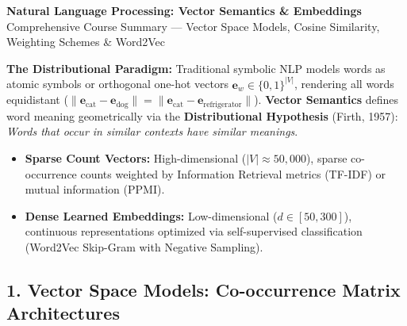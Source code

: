 \documentclass[10pt,a4paper]{article}
\begin{document}
\begin{center}
    \vspace{-4pt}
    {\LARGE\bfseries\color{themeblue} Natural Language Processing: Vector Semantics \& Embeddings}\\[1pt]
    {\small\color{darkgray} Comprehensive Course Summary --- Vector Space Models, Cosine Similarity, Weighting Schemes \& Word2Vec}
    \vspace{-4pt}
\end{center}

\begin{overviewbox}
\footnotesize
\textbf{The Distributional Paradigm:} Traditional symbolic NLP models words as atomic symbols or orthogonal one-hot vectors $\mathbf{e}_w \in \{0, 1\}^{|V|}$, rendering all words equidistant ($\|\mathbf{e}_{\text{cat}} - \mathbf{e}_{\text{dog}}\| = \|\mathbf{e}_{\text{cat}} - \mathbf{e}_{\text{refrigerator}}\|$). \textbf{Vector Semantics} defines word meaning geometrically via the \textbf{Distributional Hypothesis} (Firth, 1957): \textit{Words that occur in similar contexts have similar meanings}.
\begin{itemize}[leftmargin=10pt,topsep=1pt,itemsep=0.5pt]
    \item \textbf{Sparse Count Vectors:} High-dimensional ($|V| \approx 50{,}000$), sparse co-occurrence counts weighted by Information Retrieval metrics (TF-IDF) or mutual information (PPMI).
    \item \textbf{Dense Learned Embeddings:} Low-dimensional ($d \in [50, 300]$), continuous representations optimized via self-supervised classification (Word2Vec Skip-Gram with Negative Sampling).
\end{itemize}
\end{overviewbox}

\vspace{-3pt}
\subsection*{\color{themeblue} 1. Vector Space Models: Co-occurrence Matrix Architectures}
\vspace{-2pt}
\end{document}
